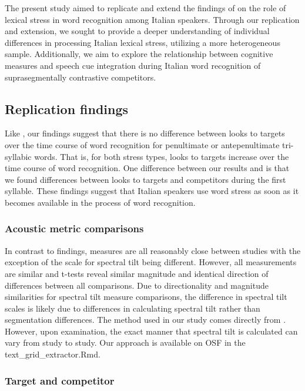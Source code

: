 
The present study aimed to replicate and extend the findings of \cite{Sulpizio_McQueen_2012} on the role of lexical stress in word recognition among Italian speakers. Through our replication and extension, we sought to provide a deeper understanding of individual differences in processing Italian lexical stress, utilizing a more heterogeneous sample. Additionally, we aim to explore the relationship between cognitive measures and speech cue integration during Italian word recognition of suprasegmentally contrastive competitors.

\subsection{Replication findings}
Like \cite{Sulpizio_McQueen_2012}, our findings suggest that there is no difference between looks to targets over the time course of word recognition for penultimate or antepenultimate tri-syllabic words. That is, for both stress types, looks to targets increase over the time course of word recognition. One difference between our results and \cite{Sulpizio_McQueen_2012} is that we found differences between looks to targets and competitors during the first syllable. These findings suggest that Italian speakers use word stress as soon as it becomes available in the process of word recognition. 

\subsubsection{Acoustic metric comparisons}
In contrast to \cite{Corretta2023} findings, measures are all reasonably close between studies with the exception of the scale for spectral tilt being different. However, all measurements are similar and t-tests reveal similar magnitude and identical direction of differences between all comparisons. Due to directionality and magnitude similarities for spectral tilt measure comparisons, the difference in spectral tilt scales is likely due to differences in calculating spectral tilt rather than segmentation differences. The method used in our study comes directly from \citep{sluijter1996spectral,cutler2007dutch}. However, upon examination, the exact manner that spectral tilt is calculated can vary from study to study. Our approach is available on OSF in the text\_grid\_extractor.Rmd. 

\subsubsection{Target and competitor}

